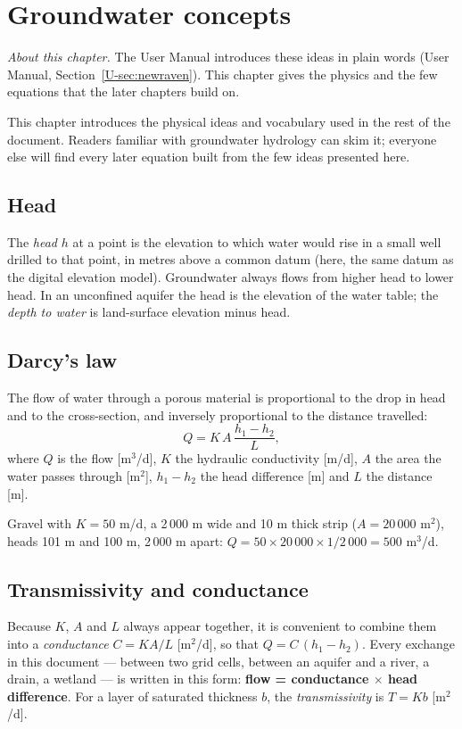 \chapter{Groundwater concepts}\label{ch:c2}\label{ch:concepts}
\noindent\emph{About this chapter.} The User Manual introduces these ideas in plain words (User Manual,
Section~\ref{U-sec:newraven}). This chapter gives the physics and the few equations that the later chapters build on.

This chapter introduces the physical ideas and vocabulary used in the rest of the document. Readers familiar with
groundwater hydrology can skim it; everyone else will find every later equation built from the few ideas presented here.


\section{Head}
The \emph{head} $h$ at a point is the elevation to which water would rise in a small well drilled to that point, in
metres above a common datum (here, the same datum as the digital elevation model). Groundwater always flows from
higher head to lower head. In an unconfined aquifer the head is the elevation of the water table; the \emph{depth to
water} is land-surface elevation minus head.

\section{Darcy's law}
The flow of water through a porous material is proportional to the drop in head and to the cross-section, and
inversely proportional to the distance travelled:
\begin{equation}
Q = K\,A\,\frac{h_1-h_2}{L},
\end{equation}
where $Q$ is the flow [m$^3$/d], $K$ the hydraulic conductivity [m/d], $A$ the area the water passes through [m$^2$],
$h_1-h_2$ the head difference [m] and $L$ the distance [m].

\begin{example}
Gravel with $K=50$ m/d, a 2\,000 m wide and 10 m thick strip ($A=20\,000$ m$^2$), heads 101 m and 100 m, 2\,000 m apart:
$Q=50\times20\,000\times1/2\,000=500$ m$^3$/d.
\end{example}

\section{Transmissivity and conductance}
Because $K$, $A$ and $L$ always appear together, it is convenient to combine them into a \emph{conductance}
$C = K A/L$ [m$^2$/d], so that $Q=C\,(h_1-h_2)$. Every exchange in this document --- between two grid cells, between an
aquifer and a river, a drain, a wetland --- is written in this form: \textbf{flow = conductance $\times$ head
difference}. For a layer of saturated thickness $b$, the \emph{transmissivity} is $T=Kb$ [m$^2$/d].

